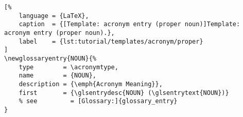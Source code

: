 
\begin{lstlisting}[%
    language = {LaTeX},
    caption  = {[Template: acronym entry (proper noun)]Template: acronym entry (proper noun).},
    label    = {lst:tutorial/templates/acronym/proper}
]
\newglossaryentry{NOUN}{%
    type        = \acronymtype,
    name        = {NOUN},
    description = {\emph{Acronym Meaning}},
    first       = {\glsentrydesc{NOUN} (\glsentrytext{NOUN})}
    % see         = [Glossary:]{glossary_entry}
}
\end{lstlisting}